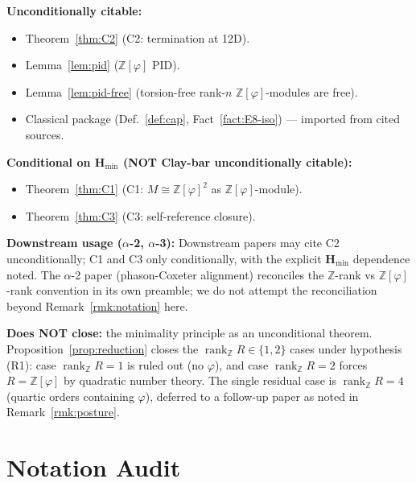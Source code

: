 \documentclass[11pt, a4paper]{amsart}
\theoremstyle{definition}
\newcommand{\Z}{\mathbb{Z}}
\newcommand{\rk}{\operatorname{rank}}
\newcommand{\Hmin}{\mathbf{H}_{\min}}
\newcommand{\Ophi}{\mathbb{Z}[\varphi]}
\begin{document}
\textbf{Unconditionally citable:}
\begin{itemize}
\item Theorem~\ref{thm:C2} (C2: termination at 12D).
\item Lemma~\ref{lem:pid} ($\Ophi$ PID).
\item Lemma~\ref{lem:pid-free} (torsion-free rank-$n$
  $\Ophi$-modules are free).
\item Classical package (Def.~\ref{def:cap},
  Fact~\ref{fact:E8-iso}) --- imported from cited sources.
\end{itemize}

\textbf{Conditional on $\Hmin$ (NOT Clay-bar unconditionally
citable):}
\begin{itemize}
\item Theorem~\ref{thm:C1} (C1: $M \cong \Ophi^{2}$ as
  $\Ophi$-module).
\item Theorem~\ref{thm:C3} (C3: self-reference closure).
\end{itemize}

\textbf{Downstream usage ($\alpha$-2, $\alpha$-3):} Downstream
papers may cite C2 unconditionally; C1 and C3 only conditionally,
with the explicit $\Hmin$ dependence noted. The $\alpha$-2 paper
(phason-Coxeter alignment) reconciles the $\Z$-rank vs
$\Ophi$-rank convention in its own preamble; we do not attempt
the reconciliation beyond Remark~\ref{rmk:notation} here.

\textbf{Does NOT close:} the minimality principle as an
unconditional theorem. Proposition~\ref{prop:reduction} closes
the $\rk_\Z R \in \{1, 2\}$ cases under hypothesis (R1): case
$\rk_\Z R = 1$ is ruled out (no $\varphi$), and case $\rk_\Z R
= 2$ forces $R = \Ophi$ by quadratic number theory. The single
residual case is $\rk_\Z R = 4$ (quartic orders containing
$\varphi$), deferred to a follow-up paper as noted in
Remark~\ref{rmk:posture}.

\section{Notation Audit}
\label{sec:notation}
\end{document}
